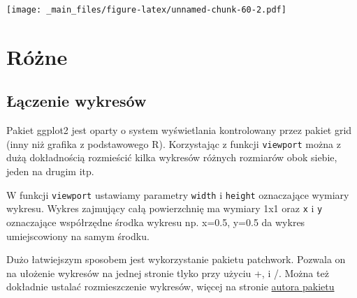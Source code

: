 \documentclass[
]{book}
\begin{document}
\texttt{[image: \_main\_files/figure-latex/unnamed-chunk-60-2.pdf]}

\hypertarget{ruxf3ux17cne}{%
\section{Różne}\label{ruxf3ux17cne}}

\hypertarget{ux142ux105czenie-wykresuxf3w}{%
\subsection{Łączenie wykresów}\label{ux142ux105czenie-wykresuxf3w}}

Pakiet ggplot2 jest oparty o system wyświetlania kontrolowany przez pakiet grid (inny niż grafika z podstawowego R). Korzystając z funkcji \texttt{viewport} można z dużą dokładnością rozmieścić kilka wykresów różnych rozmiarów obok siebie, jeden na drugim itp.

W funkcji \texttt{viewport} ustawiamy parametry \texttt{width} i \texttt{height} oznaczające wymiary wykresu. Wykres zajmujący całą powierzchnię ma wymiary 1x1 oraz \texttt{x} i \texttt{y} oznaczające współrzędne środka wykresu np. x=0.5, y=0.5 da wykres umiejscowiony na samym środku.

Dużo łatwiejszym sposobem jest wykorzystanie pakietu patchwork. Pozwala on na ułożenie wykresów na jednej stronie tlyko przy użyciu +, \textbar{} i /. Można też dokładnie ustalać rozmieszczenie wykresów, więcej na stronie \href{https://patchwork.data-imaginist.com/index.html}{autora pakietu}
\end{document}
